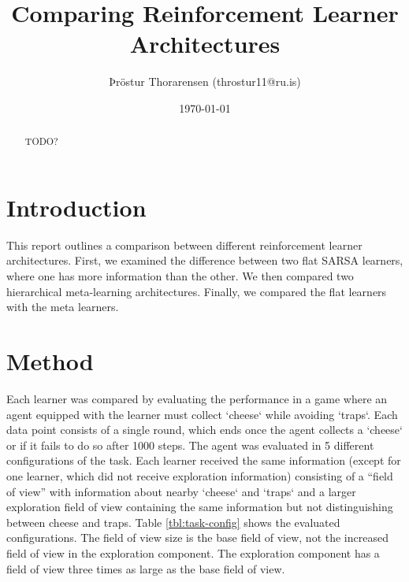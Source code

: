 \documentclass{article}
\begin{document}

\title{Comparing Reinforcement Learner Architectures}
\author{Þröstur Thorarensen (throstur11@ru.is)}
\date{\today}
\maketitle

\begin{abstract}
	TODO?
\end{abstract}

\newpage
\tableofcontents
\newpage

	\section{Introduction}
	This report outlines a comparison between different reinforcement learner architectures. First, we examined the difference between two flat SARSA learners, where one has more information than the other. We then compared two hierarchical meta-learning architectures. Finally, we compared the flat learners with the meta learners. 


	\section{Method}
	\label{sec:method}
	Each learner was compared by evaluating the performance in a game where an agent equipped with the learner must collect `cheese` while avoiding `traps`. Each data point consists of a single round, which ends once the agent collects a `cheese` or if it fails to do so after 1000 steps. The agent was evaluated in 5 different configurations of the task.
	Each learner received the same information (except for one learner, which did not receive exploration information) consisting of a ``field of view'' with information about nearby `cheese` and `traps` and a larger exploration field of view containing the same information but not distinguishing between cheese and traps.
	Table \ref{tbl:task-config} shows the evaluated configurations. The field of view size is the base field of view, not the increased field of view in the exploration component. The exploration component has a field of view three times as large as the base field of view.
	
\end{document}
